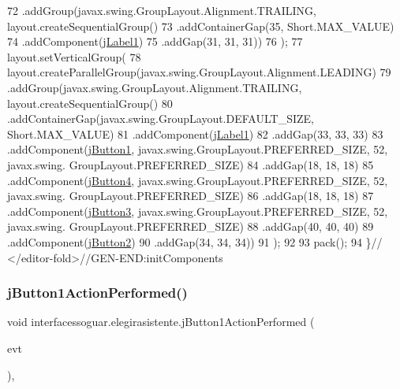 \begin{DoxyCode}
72             .addGroup(javax.swing.GroupLayout.Alignment.TRAILING, layout.createSequentialGroup()
73                 .addContainerGap(35, Short.MAX\_VALUE)
74                 .addComponent(\mbox{\hyperlink{classinterfacessoguar_1_1elegirasistente_af27c9b11cea62f6c96b7ebb47653e9de}{jLabel1}})
75                 .addGap(31, 31, 31))
76         );
77         layout.setVerticalGroup(
78             layout.createParallelGroup(javax.swing.GroupLayout.Alignment.LEADING)
79             .addGroup(javax.swing.GroupLayout.Alignment.TRAILING, layout.createSequentialGroup()
80                 .addContainerGap(javax.swing.GroupLayout.DEFAULT\_SIZE, Short.MAX\_VALUE)
81                 .addComponent(\mbox{\hyperlink{classinterfacessoguar_1_1elegirasistente_af27c9b11cea62f6c96b7ebb47653e9de}{jLabel1}})
82                 .addGap(33, 33, 33)
83                 .addComponent(\mbox{\hyperlink{classinterfacessoguar_1_1elegirasistente_a07a589d7d398109bec67c508df5c7ecd}{jButton1}}, javax.swing.GroupLayout.PREFERRED\_SIZE, 52, javax.swing.
      GroupLayout.PREFERRED\_SIZE)
84                 .addGap(18, 18, 18)
85                 .addComponent(\mbox{\hyperlink{classinterfacessoguar_1_1elegirasistente_a5b4ead7537cc84f35f56c57ca95f3217}{jButton4}}, javax.swing.GroupLayout.PREFERRED\_SIZE, 52, javax.swing.
      GroupLayout.PREFERRED\_SIZE)
86                 .addGap(18, 18, 18)
87                 .addComponent(\mbox{\hyperlink{classinterfacessoguar_1_1elegirasistente_a856391f7b77755ef9c4272b75d0e7d08}{jButton3}}, javax.swing.GroupLayout.PREFERRED\_SIZE, 52, javax.swing.
      GroupLayout.PREFERRED\_SIZE)
88                 .addGap(40, 40, 40)
89                 .addComponent(\mbox{\hyperlink{classinterfacessoguar_1_1elegirasistente_a6522f7eb0d070434d11b803b11bcd34b}{jButton2}})
90                 .addGap(34, 34, 34))
91         );
92 
93         pack();
94     \}\textcolor{comment}{// </editor-fold>//GEN-END:initComponents}
\end{DoxyCode}
\mbox{\label{classinterfacessoguar_1_1elegirasistente_a55c409487b826b045083e8ca0a748598}} 
\subsubsection{\texorpdfstring{j\+Button1\+Action\+Performed()}{jButton1ActionPerformed()}}
{\footnotesize\ttfamily void interfacessoguar.\+elegirasistente.\+j\+Button1\+Action\+Performed (\begin{DoxyParamCaption}\item[{java.\+awt.\+event.\+Action\+Event}]{evt }\end{DoxyParamCaption})\hspace{0.3cm}{\ttfamily [inline]}, {\ttfamily [private]}}


